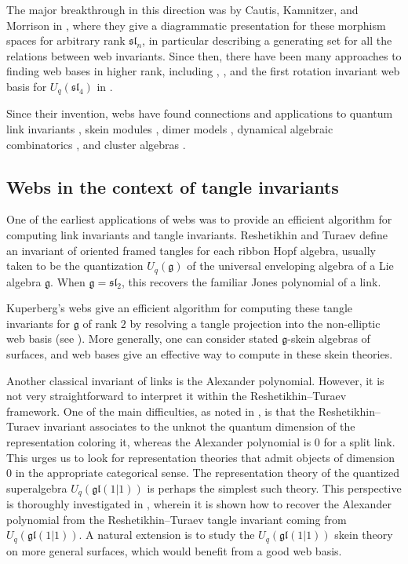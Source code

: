 \documentclass[11pt,a4paper,reqno]{amsart}
\newcommand{\g}{\mathfrak{g}}
\newcommand{\gl}{\mathfrak{gl}}
\renewcommand{\sl}{\mathfrak{sl}}
\numberwithin{equation}{section}
\theoremstyle{definition}
\theoremstyle{remark}
\begin{document}
The major breakthrough in this direction was by Cautis, Kamnitzer, and Morrison in \cite{Cautis-Kamnitzer-Morrison}, where they give a diagrammatic presentation for these morphism spaces for arbitrary rank $\sl_n$, in particular describing a generating set for all the relations between web invariants. Since then, there have been many approaches to finding web bases in higher rank, including \cite{Fontaine}, \cite{Elias}, and the first rotation invariant web basis for $U_q(\sl_4)$ in \cite{GPPSS-sl4}.

Since their invention, webs have found connections and applications to quantum link invariants \cite{Khovanov}, skein modules \cite{Le.Sikora}, dimer models \cite{Douglas-Kenyon-Shi}, dynamical algebraic combinatorics \cite{Petersen-Pylyavskyy-Rhoades}, and cluster algebras \cite{Fomin-Pylyavskyy-advances}. 

\subsection{Webs in the context of tangle invariants} One of the earliest applications of webs was to provide an efficient algorithm for computing link invariants and tangle invariants. Reshetikhin and Turaev \cite{Reshetikhin-Turaev} define an invariant of oriented framed tangles for each ribbon Hopf algebra, usually taken to be the quantization $U_q(\g)$ of the universal enveloping algebra of a Lie algebra $\g$. When $\g=\mathfrak{sl}_2$, this recovers the familiar Jones polynomial of a link.

Kuperberg's webs give an efficient algorithm for computing these tangle invariants for $\g$ of rank $2$ by resolving a tangle projection into the non-elliptic web basis (see \cite[Section 8.3]{Kuperberg}). More generally, one can consider stated $\g$-skein algebras of surfaces, and web bases give an effective way to compute in these skein theories. 

Another classical invariant of links is the Alexander polynomial. However, it is not very straightforward to interpret it within the Reshetikhin--Turaev framework. One of the main difficulties, as noted in \cite{grant16}, is that the Reshetikhin--Turaev invariant associates to the unknot the quantum dimension of the representation coloring it, whereas the Alexander polynomial is $0$ for a split link. This urges us to look for representation theories that admit objects of dimension $0$ in the appropriate categorical sense. The representation theory of the quantized superalgebra $U_q(\gl(1|1))$ is perhaps the simplest such theory. This perspective is thoroughly investigated in \cite{Sartori2013TheAP}, wherein it is shown how to recover the Alexander polynomial from the Reshetikhin--Turaev tangle invariant coming from $U_q(\gl(1|1))$. A natural extension is to study the $U_q(\gl(1|1))$ skein theory on more general surfaces, which would benefit from a good web basis.
\end{document}
